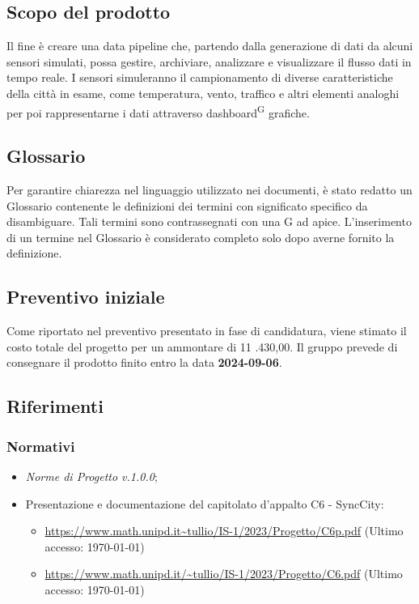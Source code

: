 \documentclass[8pt]{article}
\newcommand{\glossterm}[1]{#1\textsuperscript{G}} %
\begin{document}
\subsection{Scopo del prodotto}
Il fine è creare una data pipeline che, partendo dalla generazione di dati da alcuni sensori simulati, possa gestire, archiviare, analizzare e visualizzare il flusso dati in tempo reale. I sensori simuleranno il campionamento di diverse caratteristiche della città in esame, come temperatura, vento, traffico e altri elementi analoghi per poi rappresentarne i dati attraverso \glossterm{dashboard} grafiche.
\subsection{Glossario}
Per garantire chiarezza nel linguaggio utilizzato nei documenti, è stato redatto un Glossario contenente le definizioni dei termini con significato specifico da disambiguare. Tali termini sono contrassegnati con una G ad apice. L'inserimento di un termine nel Glossario è considerato completo solo dopo averne fornito la definizione.

\subsection{Preventivo iniziale}
Come riportato nel preventivo presentato in fase di candidatura, viene stimato il costo totale del
progetto per un ammontare di 11 .430,00\;\texteuro. Il gruppo prevede di consegnare il
prodotto finito entro la data \textbf{2024-09-06}.

\subsection{Riferimenti}
\subsubsection{Normativi}
\begin{itemize}
\setlength\itemsep{0em}
	\item \textit{Norme di Progetto v.1.0.0};
	\item Presentazione e documentazione del capitolato d'appalto C6 - SyncCity:
	\begin{itemize}
            \setlength\itemsep{0em}
		\item \href{https://www.math.unipd.it/~tullio/IS-1/2023/Progetto/C6p.pdf}{https://www.math.unipd.it\textasciitilde{}tullio/IS-1/2023/Progetto/C6p.pdf} (Ultimo accesso: \today)
		\item \href{https://www.math.unipd.it/~tullio/IS-1/2023/Progetto/C6.pdf}{https://www.math.unipd.it/\textasciitilde{}tullio/IS-1/2023/Progetto/C6.pdf} (Ultimo accesso: \today)
	\end{itemize}
\end{itemize}
\end{document}
